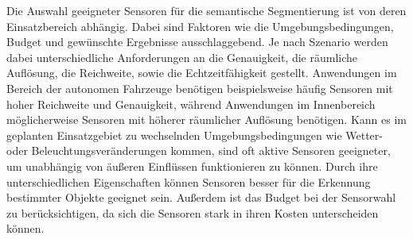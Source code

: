 Die Auswahl geeigneter Sensoren für die semantische Segmentierung ist von deren
Einsatzbereich abhängig. Dabei sind Faktoren wie die Umgebungsbedingungen,
Budget und gewünschte Ergebnisse ausschlaggebend. Je nach Szenario werden dabei
unterschiedliche Anforderungen an die Genauigkeit, die räumliche Auflösung, die
Reichweite, sowie die Echtzeitfähigkeit gestellt. Anwendungen im Bereich der
autonomen Fahrzeuge benötigen beispielsweise häufig Sensoren mit hoher
Reichweite und Genauigkeit, während Anwendungen im Innenbereich möglicherweise
Sensoren mit höherer räumlicher Auflösung benötigen. Kann es im geplanten
Einsatzgebiet zu wechselnden Umgebungsbedingungen wie Wetter- oder
Beleuchtungsveränderungen kommen, sind oft aktive Sensoren geeigneter, um
unabhängig von äußeren Einflüssen funktionieren zu können. Durch ihre
unterschiedlichen Eigenschaften können Sensoren besser für die Erkennung
bestimmter Objekte geeignet sein. Außerdem ist das Budget bei der Sensorwahl zu
berücksichtigen, da sich die Sensoren stark in ihren Kosten unterscheiden
können. \cite{20222324}

